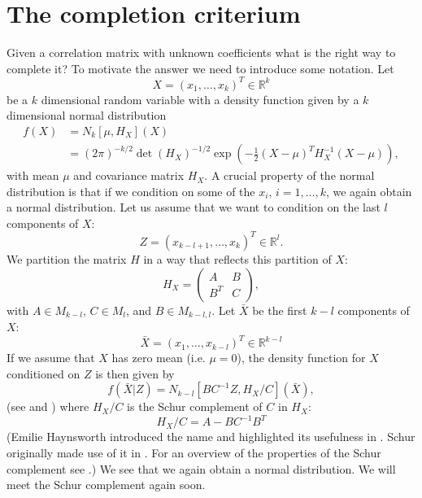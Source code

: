 \documentclass[11pt, a4paper]{article}
\newcommand{\R}{\mathbb{R}}
\begin{document}
\section{The completion criterium}\label{sec.criterium}
Given a correlation matrix with unknown coefficients what is the right way to complete it? To motivate the answer we need to introduce some notation. Let 
\begin{equation}
	X = ( x_1, \ldots, x_k )^T\in \R^k
\end{equation}
be a $k$ dimensional random variable with a density function given by a $k$ dimensional normal distribution
\begin{align}
	f(X) & = N_k[\mu, H_X]( X ) \\
	& = (2\pi)^{-k/2}\det(H_X)^{-1/2}\exp\left(-\frac{1}{2}(X -\mu)^T H_X^{-1} (X-\mu)\right),
\end{align}
with mean $\mu$ and covariance matrix $H_X$. A crucial property of the normal distribution is that if we condition on some of the $x_i$, $i=1, \dots, k$, we again obtain a normal distribution. Let us assume that we want to condition on the last $l$ components of $X$:
\begin{equation}
	Z = (x_{k-l+1}, \ldots, x_k)^T \in \R^l.
\end{equation}
We partition the matrix $H$ in a way that reflects this partition of $X$:
\begin{equation}
	H_X = \begin{pmatrix}
		A & B \\
		B^T & C
	\end{pmatrix},
\end{equation}
with $A\in M_{k-l}$, $C\in M_l$, and $B\in M_{k-l,l}$. Let $\bar X$ be the first $k-l$ components of $X$:
\begin{equation}
	\bar X = (x_1, \ldots, x_{k-l})^T\in \R^{k-l}
\end{equation}
If we assume that $X$ has zero mean (i.e. $\mu=0$), the density function for $X$ conditioned on $Z$ is then given by
\begin{equation}
	f(\bar X \vert Z ) = N_{k-l}[BC^{-1}Z, H_X/C ](\bar X),
\end{equation}
(see \cite[chapter 8]{rao} and \cite{cottle}) where $H_X/C$ is the Schur complement of $C$ in $H_X$:
\begin{equation}\label{eqn.hxc}
	H_X/C = A - B C^{-1}B^T
\end{equation}
(Emilie Haynsworth introduced the name and highlighted its usefulness in \cite{hayns}. Schur originally made use of it in \cite{schur}. For an overview of the properties of the Schur complement see \cite{horn}.) We see that we again obtain a normal distribution. We will meet the Schur complement again soon.
\end{document}
